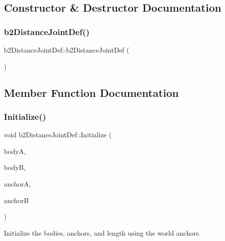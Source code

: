 \subsection{Constructor \& Destructor Documentation}
\mbox{\label{structb2_distance_joint_def_a91925a15ed268144ddc9df04f935801c}} 
\subsubsection{\texorpdfstring{b2DistanceJointDef()}{b2DistanceJointDef()}}
{\footnotesize\ttfamily b2\+Distance\+Joint\+Def\+::b2\+Distance\+Joint\+Def (\begin{DoxyParamCaption}{ }\end{DoxyParamCaption})\hspace{0.3cm}{\ttfamily [inline]}}



\subsection{Member Function Documentation}
\mbox{\label{structb2_distance_joint_def_a99788a534638cc28cd1e44e0036503f0}} 
\subsubsection{\texorpdfstring{Initialize()}{Initialize()}}
{\footnotesize\ttfamily void b2\+Distance\+Joint\+Def\+::\+Initialize (\begin{DoxyParamCaption}\item[{\mbox{\hyperlink{classb2_body}{b2\+Body}} $\ast$}]{bodyA,  }\item[{\mbox{\hyperlink{classb2_body}{b2\+Body}} $\ast$}]{bodyB,  }\item[{const \mbox{\hyperlink{structb2_vec2}{b2\+Vec2}} \&}]{anchorA,  }\item[{const \mbox{\hyperlink{structb2_vec2}{b2\+Vec2}} \&}]{anchorB }\end{DoxyParamCaption})}

Initialize the bodies, anchors, and length using the world anchors. 

